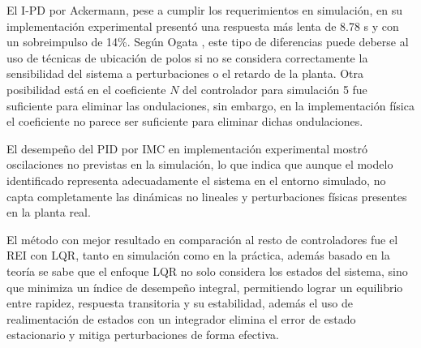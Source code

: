 \documentclass[conference,onecolumn,12pt]{IEEEtran}
\numberwithin{equation}{subsection}
\begin{document}
El I-PD por Ackermann, pese a cumplir los requerimientos en simulación, en su implementación experimental presentó una respuesta más lenta de 8.78 s y con un sobreimpulso de 14\%. Según Ogata \cite{ogata2010}, este tipo de diferencias puede deberse al uso de técnicas de ubicación de polos si no se considera correctamente la sensibilidad del sistema a perturbaciones o el retardo de la planta. Otra posibilidad está en el coeficiente $N$ del controlador para simulación 5 fue suficiente para eliminar las ondulaciones, sin embargo, en la implementación física el coeficiente no parece ser suficiente para eliminar dichas ondulaciones. 

El desempeño del PID por IMC en implementación experimental mostró oscilaciones no previstas en la simulación, lo que indica que aunque el modelo identificado representa adecuadamente el sistema en el entorno simulado, no capta completamente las dinámicas no lineales y perturbaciones físicas presentes en la planta real.

El método con mejor resultado en comparación al resto de controladores fue el REI con LQR, tanto en simulación como en la práctica, además basado en la teoría se sabe que el enfoque LQR no solo considera los estados del sistema, sino que minimiza un índice de desempeño integral, permitiendo lograr un equilibrio entre rapidez, respuesta transitoria y su estabilidad, además el uso de realimentación de estados con un integrador elimina el error de estado estacionario y mitiga perturbaciones de forma efectiva.
\end{document}
